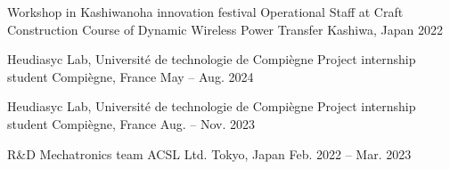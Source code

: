 

\begin{cvhonors}

  \cvhonor
    {Workshop in Kashiwanoha innovation festival} %
    {Operational Staff at Craft Construction Course of Dynamic Wireless Power Transfer} %
    {Kashiwa, Japan} %
    {2022} %
    
\end{cvhonors}



\begin{cvhonors}
  \cvhonor
    {Heudiasyc Lab, Université de technologie de Compiègne} %
    {Project internship student} %
    {Compiègne, France} %
    {May -- Aug. 2024} %
    
  \cvhonor
    {Heudiasyc Lab, Université de technologie de Compiègne} %
    {Project internship student} %
    {Compiègne, France} %
    {Aug. -- Nov. 2023} %

    
  \cvhonor
    {R\&D Mechatronics team} %
    {ACSL Ltd.} %
    {Tokyo, Japan} %
    {Feb. 2022 -- Mar. 2023} %
    
\end{cvhonors}



